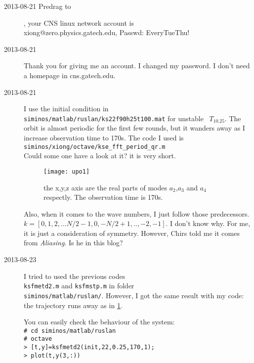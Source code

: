 \begin{description}
\item[2013-08-21 Predrag to \XD], your CNS linux network account is
\\
xiong@zero.physics.gatech.edu,
Passwd: EveryTueThu!

\item[2013-08-21 \XD]
Thank you for giving me an account. I changed my password. I don't
need a homepage in cns.gatech.edu.

\item[2013-08-21 \XD]
I use the initial condition in\\
\texttt{siminos/matlab/ruslan/ks22f90h25t100.mat}
for unstable \po\ $T_{10.25}$. The orbit is almost periodic for the
first few rounds, but it wanders away as I increase observation time to 170s.
The code I used is\\
\texttt{siminos/xiong/octave/kse\_fft\_period\_qr.m}
\\
Could some one have a look at it? it is very short.

\begin{figure}%
 \centering
 \texttt{[image: upo1]}
 \caption{the x,y,z axis are the real parts of modes  $a_2$,$a_3$ and $a_4$ respectly. The
 observation time is 170s.}
 \label{xiongupo1}
\end{figure}

Also, when it comes to the wave numbers, I just follow those predecessors.
$k=[0,1,2,...N/2-1,0,-N/2+1,..,-2,-1]$. I don't know why. For me, it
is just a consideration of symmetry. However, Chirs told me it comes from
\textit{Aliasing}. Is he in this blog?

\item[2013-08-23 \XD]
I tried to used the previous codes\\
\texttt{ksfmetd2.m} and \texttt{ksfmstp.m} in folder \\
\texttt{siminos/matlab/ruslan/}.
However, I got the same result with my code: the trajectory runs away as
in \ref{xiongupo1}.

You can easily check the behaviour of the system:\\
\texttt{\# cd siminos/matlab/ruslan}\\
\texttt{\# octave}\\
\texttt{> [t,y]=ksfmetd2(init,22,0.25,170,1);}\\
\texttt{> plot(t,y(3,:))}\\


\end{description}
